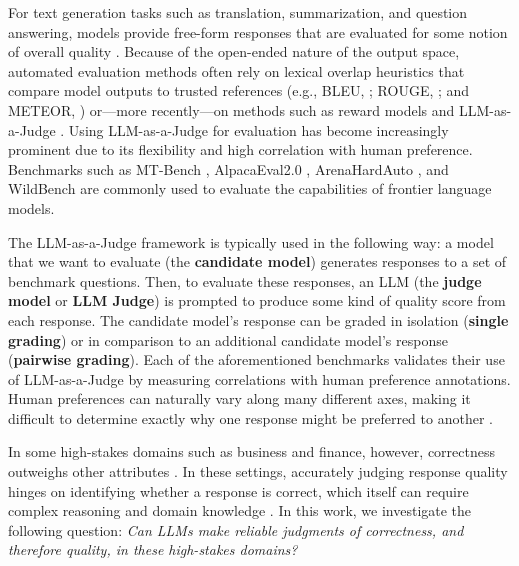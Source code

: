 \documentclass{article}
\begin{document}
For text generation tasks such as translation, summarization, and question answering, models provide free-form responses that are evaluated for some notion of overall quality \citep{Celikyilmaz2020EvaluationOT}. Because of the open-ended nature of the output space, automated evaluation methods often rely on lexical overlap heuristics that compare model outputs to trusted references (e.g., BLEU, \citealp{bleu}; ROUGE, \citealp{rouge}; and METEOR, \citealp{meteor}) or---more recently---on methods such as reward models \citep{ouyang2022training,kocmi-federmann-2023-large,fu-etal-2024-gptscore} and LLM-as-a-Judge \citep{mtbench,JudgeSurvey}. Using LLM-as-a-Judge for evaluation has become increasingly prominent due to its flexibility and high correlation with human preference. Benchmarks such as MT-Bench \citep{mtbench}, AlpacaEval2.0 \citep{alpacaeval2}, ArenaHardAuto \citep{arenahard}, and WildBench \citep{lin2024wildbench} are commonly used to evaluate the capabilities of frontier language models.



The LLM-as-a-Judge framework is typically used in the following way: a model that we want to evaluate (the \textbf{candidate model}) generates responses to a set of benchmark questions. Then, to evaluate these responses, an LLM (the \textbf{judge model} or \textbf{LLM Judge}) is prompted to produce some kind of quality score from each response. The candidate model's response can be graded in isolation (\textbf{single grading}) or in comparison to an additional candidate model's response (\textbf{pairwise grading}). Each of the aforementioned benchmarks validates their use of LLM-as-a-Judge by measuring correlations with human preference annotations. Human preferences can naturally vary along many different axes, making it difficult to determine exactly why one response might be preferred to another \citep{DBLP:conf/icml/SorensenMFGMRYJ24,SOSBench,Szymanski2024ComparingCD}.

In some high-stakes domains such as business and finance, however, correctness outweighs other attributes \citep{bommasani2021opportunities,SOSBench,bizbench}. In these settings, accurately judging response quality hinges on identifying whether a response is correct, which itself can require complex reasoning and domain knowledge \citep{JudgeBench,mtbench}. In this work, we investigate the following question: \emph{Can LLMs make reliable judgments of correctness, and therefore quality, in these high-stakes domains?}
\end{document}
